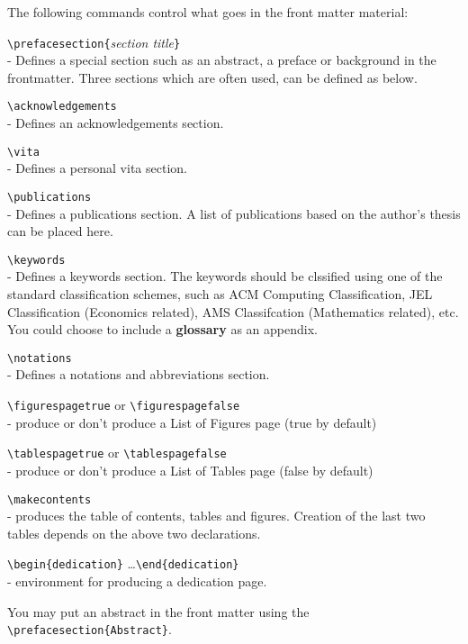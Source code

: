 	    The following commands  control what goes in the front matter
material:
\begin{description} 
 	\item \verb|\prefacesection{|{\em section title}\verb|}|   \\
		- Defines a special section such as an abstract, a preface or 
		  background in the frontmatter. Three sections which are often used, 
		  can be defined as below.
	\item \verb|\acknowledgements|   \\
                - Defines an acknowledgements section.
	\item \verb|\vita|   \\
                - Defines a personal vita section.
	\item \verb|\publications|   \\
                - Defines a publications section. A list of publications
                  based on the author's thesis can be placed here.
	\item \verb|\keywords|   \\
                - Defines a keywords section. The keywords should be clssified using
		one of the standard classification schemes, such as ACM Computing
		Classification, JEL Classification (Economics related),
		AMS Classifcation (Mathematics related), etc. You could choose to
		include a {\bf glossary} as an appendix.
	\item \verb|\notations|   \\
                - Defines a notations and abbreviations section.
	\item \verb|\figurespagetrue| or \verb|\figurespagefalse| \\ 
		- produce or don't produce a List of Figures page
		  (true by default)
	\item \verb|\tablespagetrue| or \verb|\tablespagefalse|  \\
		- produce or don't produce a List of Tables page
		  (false by default)
	\item \verb|\makecontents| \\
		-  produces the table of  contents,
tables  and figures. Creation of  the  last  two tables depends on the
above two declarations.
	\item \verb|\begin{dedication}| \ldots \verb|\end{dedication}|
\\
- environment for producing a dedication page.
\end{description}
        You may put an abstract in the front matter using the
\verb|\prefacesection{Abstract}|. 
    

